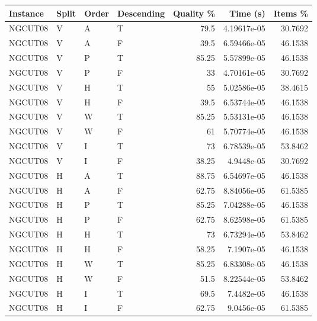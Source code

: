 \begin{tabular}{llllrrr}
    \hline
    Instance & Split & Order & Descending & Quality \% & Time (s)    & Items \% \\
    \hline
    NGCUT08  & V     & A     & T          & 79.5       & 4.19617e-05 & 30.7692  \\
    NGCUT08  & V     & A     & F          & 39.5       & 6.59466e-05 & 46.1538  \\
    NGCUT08  & V     & P     & T          & 85.25      & 5.57899e-05 & 46.1538  \\
    NGCUT08  & V     & P     & F          & 33         & 4.70161e-05 & 30.7692  \\
    NGCUT08  & V     & H     & T          & 55         & 5.02586e-05 & 38.4615  \\
    NGCUT08  & V     & H     & F          & 39.5       & 6.53744e-05 & 46.1538  \\
    NGCUT08  & V     & W     & T          & 85.25      & 5.53131e-05 & 46.1538  \\
    NGCUT08  & V     & W     & F          & 61         & 5.70774e-05 & 46.1538  \\
    NGCUT08  & V     & I     & T          & 73         & 6.78539e-05 & 53.8462  \\
    NGCUT08  & V     & I     & F          & 38.25      & 4.9448e-05  & 30.7692  \\
    NGCUT08  & H     & A     & T          & 88.75      & 6.54697e-05 & 46.1538  \\
    NGCUT08  & H     & A     & F          & 62.75      & 8.84056e-05 & 61.5385  \\
    NGCUT08  & H     & P     & T          & 85.25      & 7.04288e-05 & 46.1538  \\
    NGCUT08  & H     & P     & F          & 62.75      & 8.62598e-05 & 61.5385  \\
    NGCUT08  & H     & H     & T          & 73         & 6.73294e-05 & 53.8462  \\
    NGCUT08  & H     & H     & F          & 58.25      & 7.1907e-05  & 46.1538  \\
    NGCUT08  & H     & W     & T          & 85.25      & 6.83308e-05 & 46.1538  \\
    NGCUT08  & H     & W     & F          & 51.5       & 8.22544e-05 & 53.8462  \\
    NGCUT08  & H     & I     & T          & 69.5       & 7.4482e-05  & 46.1538  \\
    NGCUT08  & H     & I     & F          & 62.75      & 9.0456e-05  & 61.5385  \\

\end{tabular}

